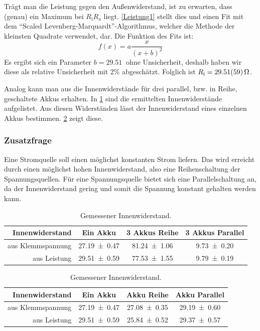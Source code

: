 \documentclass[
	a4paper,
	12pt,
	pagesize,
	ngerman
]{scrartcl}
\begin{document}
	Trägt man die Leistung gegen den Außenwiderstand, ist zu erwarten, dass (genau) ein Maximum bei $R_\text{i}  R_\text{a}$ liegt.
	\cref{Leistung1} stellt dies und einen Fit mit dem \enquote{Scaled Levenberg-Marquardt}-Algorithmus, welcher die Methode der kleinsten Quadrate verwendet, dar. 
	Die Funktion des Fits ist:
	\begin{equation}
		f(x)=a\frac{x}{(x+b)^2}
	\end{equation}
	Es ergibt sich ein Parameter $b = \SI{29,51}{}$ ohne Unsicherheit, deshalb haben wir diese als relative Unsicherheit mit 2\% abgeschätzt. 
	Folglich ist $R_\text{i} = \SI{29,51 \pm 0,59}{\Omega}$.

	Analog kann man aus  die Innenwiderstände für drei parallel, bzw. in Reihe, geschaltete Akkus erhalten.
	In \cref{Tabelle_Innenwiderstaende} sind die ermittelten Innenwiderstände aufgelistet. 
	Aus diesen Widerständen lässt der Innenwiderstand eines einzelnen Akkus bestimmen.
	\cref{Tabelle_Innenwiderstaende2} zeigt diese. %


	\subsubsection*{Zusatzfrage}
	Eine Stromquelle soll einen möglichst konstanten Strom liefern. Das wird erreicht durch einen möglichst hohen Innenwiderstand, also eine Reihenschaltung der Spannungsquellen. Für eine Spannungsquelle bietet sich eine Parallelschaltung an, da der Innenwiderstand gering und somit die Spannung konstant gehalten werden kann.
	\begin{table}[tb]
		\centering
		\begin{tabular}{ r | c | c | c}
			Innenwiderstand& Ein Akku & 3 Akkus Reihe & 3 Akkus Parallel \\ \hline
			aus Klemmspannung& \SI{27,19 \pm 0,47 }{\Omega}& \SI{81,24 \pm 1,06 }{\Omega}&  \SI{9,73 \pm 0,20 }{\Omega} \\
			aus Leistung & \SI{29,51 \pm 0,59 }{\Omega}&  \SI{77,53 \pm 1,55 }{\Omega}&  \SI{9,79 \pm 0,19 }{\Omega}\\

		\end{tabular}
		\caption{Gemessener Innenwiderstand.} %
		\label{Tabelle_Innenwiderstaende} 
	\end{table}
	\begin{table}[tb]
		\centering
		\begin{tabular}{ r | c | c | c}
			Innenwiderstand& Ein Akku & Akku Reihe & Akku Parallel \\ \hline
			aus Klemmspannung& \SI{27,19 \pm 0,47 }{\Omega}& \SI{27,08 \pm 0,35 }{\Omega}&  \SI{29,19 \pm 0,60 }{\Omega} \\
			aus Leistung & \SI{29,51 \pm 0,59 }{\Omega}&  \SI{25,84 \pm 0,52 }{\Omega}&  \SI{29,37 \pm 0,57 }{\Omega}\\

		\end{tabular}
		\caption{Gemessener Innenwiderstand.} %
		\label{Tabelle_Innenwiderstaende2} 
	\end{table}
\end{document}
